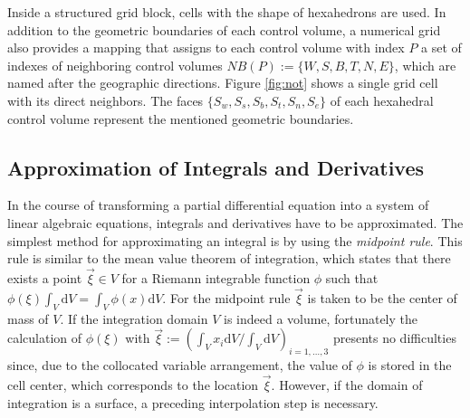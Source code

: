 Inside a structured grid block, cells with the shape of hexahedrons are used. In addition to the geometric boundaries of each control volume, a numerical grid also provides a mapping that assigns to each control volume with index \(P\) a set of indexes of neighboring control volumes \(NB(P):=\{W,S,B,T,N,E\}\), which are named after the geographic directions. Figure \ref{fig:not} shows a single grid cell with its direct neighbors. The faces \(\{S_w,S_s,S_b,S_t,S_n,S_e\}\) of each hexahedral control volume represent the mentioned geometric boundaries. 

\begin{figure}[h]
  \hfil
 \end{figure}

\subsection{Approximation of Integrals and Derivatives}
\label{sec:approxintegralderivative}

In the course of transforming a partial differential equation into a system of linear algebraic equations, integrals and derivatives have to be approximated. The simplest method for approximating an integral is by using the \emph{midpoint rule}. This rule is similar to the mean value theorem of integration, which states that there exists a point \(\vec{\xi} \in V\) for a Riemann integrable function \(\phi\) such that \(\textstyle \phi(\xi) \int_V \mathrm{d}V = \int_V \phi(x) \mathrm{d}V\). For the midpoint rule \(\vec{\xi}\) is taken to be the center of mass of \(V\). If the integration domain \(V\) is indeed a volume, fortunately the calculation of \(\phi(\mathbb{\xi})\) with \(\textstyle \vec{\xi} := \left({ \int_V x_i \mathrm{d}V }/{ \int_V \mathrm{d}V } \right)_{i = 1,\dots,3}\) presents no difficulties since, due to the collocated variable arrangement, the value of \(\phi\) is stored in the cell center, which corresponds to the location \(\vec{\xi}\). However, if the domain of integration is a surface, a preceding interpolation step is necessary.

